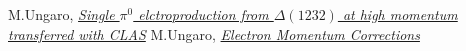\begin{thebibliography}{mybib}
     {M.Ungaro},  \href{https://maureeungaro.github.io/home/meson/pi0_delta/pi0_delta}     {\it Single $\pi^0$ elctroproduction from $\Delta(1232)$ at high momentum transferred with CLAS}
     {M.Ungaro},  \href{https://maureeungaro.github.io/home/meson/pi0_resonance/e_kin_cor} {\it Electron Momentum Corrections}
\end{thebibliography}
